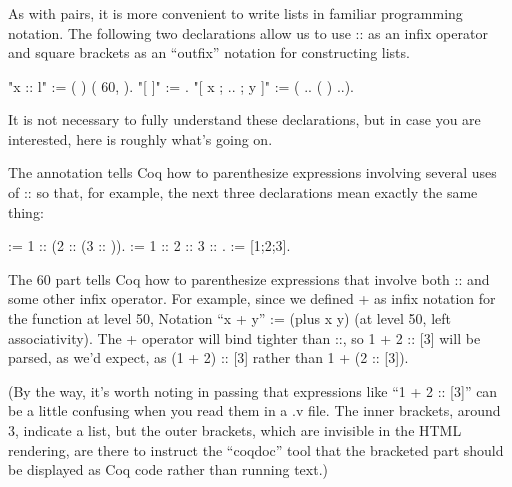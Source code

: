 \documentclass[12pt]{report}
\begin{document}
\subsubsection{ }

 As with pairs, it is more convenient to write lists in
    familiar programming notation.  The following two declarations
    allow us to use :: as an infix  operator and square
    brackets as an ``outfix'' notation for constructing lists. \begin{coqdoccode}
\coqdocemptyline
\coqdocnoindent
{} "x :: l" := (  ) (  60,  ).\coqdoceol
\coqdocnoindent
{} "[ ]" := .\coqdoceol
\coqdocnoindent
{} "[ x ; .. ; y ]" := (  .. (  ) ..).\coqdoceol
\coqdocemptyline
\end{coqdoccode}
It is not necessary to fully understand these declarations,
    but in case you are interested, here is roughly what's going on.


    The   annotation tells Coq how to parenthesize
    expressions involving several uses of :: so that, for example,
    the next three declarations mean exactly the same thing: \begin{coqdoccode}
\coqdocemptyline
\coqdocnoindent
{}  := 1 :: (2 :: (3 :: )).\coqdoceol
\coqdocnoindent
{}  := 1 :: 2 :: 3 :: .\coqdoceol
\coqdocnoindent
{}  := [1;2;3].\coqdoceol
\coqdocemptyline
\end{coqdoccode}
The   60 part tells Coq how to parenthesize
    expressions that involve both :: and some other infix operator.
    For example, since we defined + as infix notation for the 
    function at level 50,
Notation ``x + y'' := (plus x y)  
                    (at level 50, left associativity).
   The + operator will bind tighter than ::, so 1 + 2 :: [3]
   will be parsed, as we'd expect, as (1 + 2) :: [3] rather than 1
   + (2 :: [3]).


   (By the way, it's worth noting in passing that expressions like ``1
   + 2 :: [3]'' can be a little confusing when you read them in a .v
   file.  The inner brackets, around 3, indicate a list, but the outer
   brackets, which are invisible in the HTML rendering, are there to
   instruct the ``coqdoc'' tool that the bracketed part should be
   displayed as Coq code rather than running text.)
\end{document}

